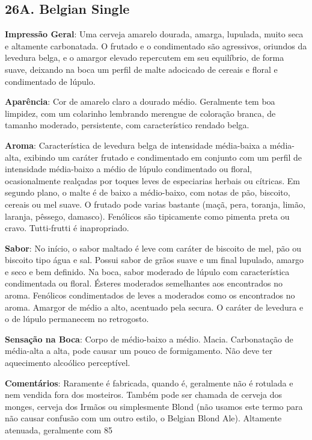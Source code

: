\subsection*{26A. Belgian Single}

\textbf{Impressão Geral}: Uma cerveja amarelo dourada, amarga, lupulada, muito seca e altamente carbonatada. O frutado e o condimentado são agressivos, oriundos da levedura belga, e o amargor elevado repercutem em seu equilíbrio, de forma suave, deixando na boca um perfil de malte adocicado de cereais e floral e condimentado de lúpulo.

\textbf{Aparência}: Cor de amarelo claro a dourado médio. Geralmente tem boa limpidez, com um colarinho lembrando merengue de coloração branca, de tamanho moderado, persistente, com característico rendado belga.

\textbf{Aroma}: Característica de levedura belga de intensidade média-baixa a média-alta, exibindo um caráter frutado e condimentado em conjunto com um perfil de intensidade média-baixo a médio de lúpulo condimentado ou floral, ocasionalmente realçadas por toques leves de especiarias herbais ou cítricas. Em segundo plano, o malte é de baixo a médio-baixo, com notas de pão, biscoito, cereais ou mel suave. O frutado pode varias bastante (maçã, pera, toranja, limão, laranja, pêssego, damasco). Fenólicos são tipicamente como pimenta preta ou cravo. Tutti-frutti é inapropriado.

\textbf{Sabor}: No início, o sabor maltado é leve com caráter de biscoito de mel, pão ou biscoito tipo água e sal. Possui sabor de grãos suave e um final lupulado, amargo e seco e bem definido. Na boca, sabor moderado de lúpulo com característica condimentada ou floral. Ésteres moderados semelhantes aos encontrados no aroma. Fenólicos condimentados de leves a moderados como os encontrados no aroma. Amargor de médio a alto, acentuado pela secura. O caráter de levedura e o de lúpulo permanecem no retrogosto.

\textbf{Sensação na Boca}: Corpo de médio-baixo a médio. Macia. Carbonatação de média-alta a alta, pode causar um pouco de formigamento. Não deve ter aquecimento alcoólico perceptível.

\textbf{Comentários}: Raramente é fabricada, quando é, geralmente não é rotulada e nem vendida fora dos mosteiros. Também pode ser chamada de cerveja dos monges, cerveja dos Irmãos ou simplesmente Blond (não usamos este termo para não causar confusão com um outro estilo, o Belgian Blond Ale). Altamente atenuada, geralmente com 85%

